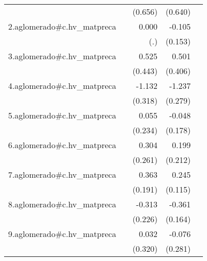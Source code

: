 {\begin{longtable}{l*{4}{D{.}{.}{-1}}}
            &                     &     (0.656)         &     (0.640)         &                     \\
\addlinespace
2.aglomerado#c.hv\_matpreca&                     &       0.000         &      -0.105         &                     \\
            &                     &         (.)         &     (0.153)         &                     \\
\addlinespace
3.aglomerado#c.hv\_matpreca&                     &       0.525         &       0.501         &                     \\
            &                     &     (0.443)         &     (0.406)         &                     \\
\addlinespace
4.aglomerado#c.hv\_matpreca&                     &      -1.132\sym{***}&      -1.237\sym{***}&                     \\
            &                     &     (0.318)         &     (0.279)         &                     \\
\addlinespace
5.aglomerado#c.hv\_matpreca&                     &       0.055         &      -0.048         &                     \\
            &                     &     (0.234)         &     (0.178)         &                     \\
\addlinespace
6.aglomerado#c.hv\_matpreca&                     &       0.304         &       0.199         &                     \\
            &                     &     (0.261)         &     (0.212)         &                     \\
\addlinespace
7.aglomerado#c.hv\_matpreca&                     &       0.363         &       0.245\sym{*}  &                     \\
            &                     &     (0.191)         &     (0.115)         &                     \\
\addlinespace
8.aglomerado#c.hv\_matpreca&                     &      -0.313         &      -0.361\sym{*}  &                     \\
            &                     &     (0.226)         &     (0.164)         &                     \\
\addlinespace
9.aglomerado#c.hv\_matpreca&                     &       0.032         &      -0.076         &                     \\
            &                     &     (0.320)         &     (0.281)         &                     \\

\end{longtable}}
